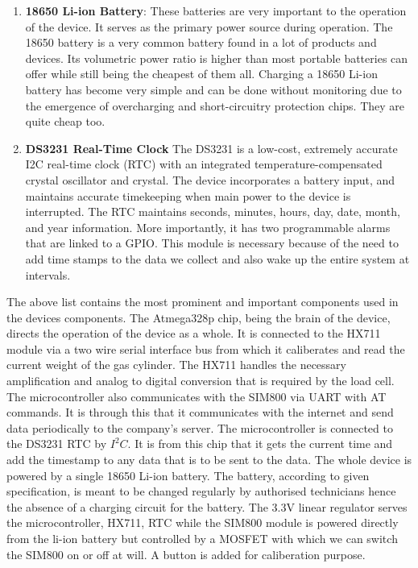 \begin{enumerate}
\item \textbf{18650 Li-ion Battery}: These batteries are very important to the operation of the device. It serves as the primary power source  during operation. The 18650 battery is a very common battery found in a lot of products and devices. Its volumetric power ratio is higher than most portable batteries can offer while still being the cheapest of them all. Charging a 18650 Li-ion battery has become very simple and can be done without monitoring due to the emergence of overcharging and short-circuitry protection chips.  They are quite cheap too. 

\item \textbf{DS3231 Real-Time Clock} The DS3231 is a low-cost, extremely accurate I2C real-time clock (RTC) with an integrated  temperature-compensated crystal oscillator and crystal. The device incorporates a battery input, and  maintains  accurate timekeeping when main  power to the device is interrupted. The RTC maintains seconds, minutes, hours, day, date, month, and year  information. More importantly, it has two programmable alarms that are linked to a GPIO. This module is necessary because of the need to add time stamps to the data we collect and also wake up the entire system at intervals.
\end{enumerate}
The above list contains the most prominent and important components used in the devices components. The Atmega328p chip, being the brain of the device, directs the operation of the device as a whole. It is connected to the HX711 module via a two wire serial interface bus from which it caliberates and read the current weight of the gas cylinder. The HX711 handles the necessary amplification and analog to digital conversion that is required by the load cell. The microcontroller also communicates with the SIM800 via UART with AT commands. It is through this that it communicates with the internet and send data periodically to the company's server. The microcontroller is connected to the DS3231 RTC by $I^2C$. It is from this chip that it gets the current time and add the timestamp to any data that is to be sent to the data. The whole device is powered by a single 18650 Li-ion battery. The battery, according to given specification, is meant to be changed regularly by authorised technicians hence the absence of a charging circuit for the battery. The 3.3V linear regulator serves the microcontroller, HX711, RTC while the SIM800 module is powered directly from the li-ion battery but controlled by a MOSFET with which we can switch the SIM800 on or off at will. A button is added for caliberation purpose.

